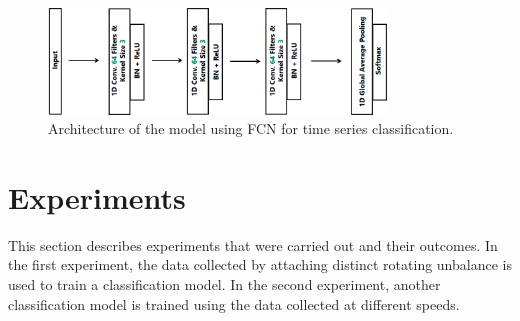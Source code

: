 \documentclass[
  manuscript=report,  %
  layout=preprint,  %
  year=20xx,
  volume=x,
]{extra/joas}
\begin{document}
\begin{figure}[ht!]
  \centering
  \includegraphics[width=0.8\textwidth]{figures/FCN.png}
  \caption{Architecture of the model using FCN for time series classification.}
  \label{fig:FCN}
\end{figure}




\section{Experiments}

This section describes experiments that were carried out and their outcomes. In the first experiment, the data collected by attaching distinct rotating unbalance is used to train a classification model. In the second experiment, another classification model is trained using the data collected at different speeds. 


%
\end{document}
